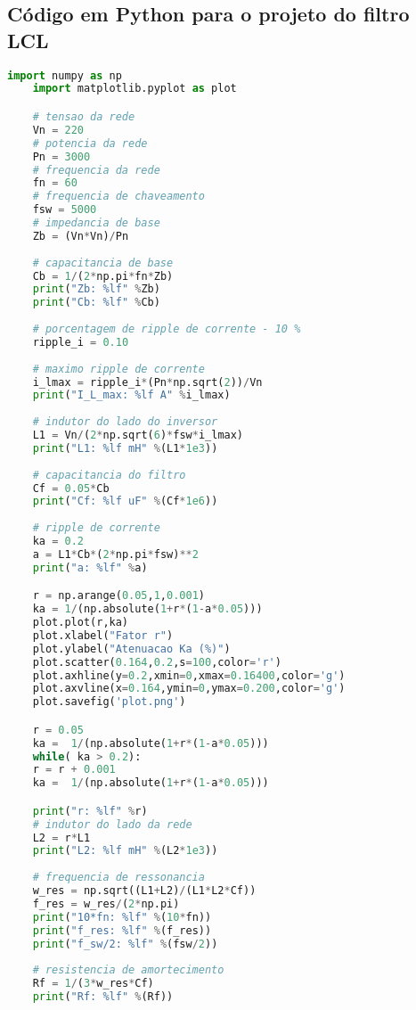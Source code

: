 \begin{anexosenv}

\partanexos

\chapter{Código em Python para o projeto do filtro LCL}\label{codigo-python-filtro}

\begin{lstlisting}[language=Python]
    import numpy as np 
    import matplotlib.pyplot as plot

    # tensao da rede
    Vn = 220
    # potencia da rede
    Pn = 3000
    # frequencia da rede
    fn = 60
    # frequencia de chaveamento
    fsw = 5000
    # impedancia de base
    Zb = (Vn*Vn)/Pn
    
    # capacitancia de base
    Cb = 1/(2*np.pi*fn*Zb)
    print("Zb: %lf" %Zb)
    print("Cb: %lf" %Cb)
    
    # porcentagem de ripple de corrente - 10 %
    ripple_i = 0.10
    
    # maximo ripple de corrente
    i_lmax = ripple_i*(Pn*np.sqrt(2))/Vn
    print("I_L_max: %lf A" %i_lmax)
    
    # indutor do lado do inversor
    L1 = Vn/(2*np.sqrt(6)*fsw*i_lmax)
    print("L1: %lf mH" %(L1*1e3))
    
    # capacitancia do filtro
    Cf = 0.05*Cb
    print("Cf: %lf uF" %(Cf*1e6))
    
    # ripple de corrente
    ka = 0.2
    a = L1*Cb*(2*np.pi*fsw)**2
    print("a: %lf" %a)

    r = np.arange(0.05,1,0.001)
    ka = 1/(np.absolute(1+r*(1-a*0.05)))
    plot.plot(r,ka)
    plot.xlabel("Fator r")
    plot.ylabel("Atenuacao Ka (%)")
    plot.scatter(0.164,0.2,s=100,color='r')
    plot.axhline(y=0.2,xmin=0,xmax=0.16400,color='g')
    plot.axvline(x=0.164,ymin=0,ymax=0.200,color='g')
    plot.savefig('plot.png')

    r = 0.05
    ka =  1/(np.absolute(1+r*(1-a*0.05)))
    while( ka > 0.2):
    r = r + 0.001
    ka =  1/(np.absolute(1+r*(1-a*0.05)))

    print("r: %lf" %r)
    # indutor do lado da rede
    L2 = r*L1
    print("L2: %lf mH" %(L2*1e3))
    
    # frequencia de ressonancia
    w_res = np.sqrt((L1+L2)/(L1*L2*Cf))
    f_res = w_res/(2*np.pi)
    print("10*fn: %lf" %(10*fn))
    print("f_res: %lf" %(f_res))
    print("f_sw/2: %lf" %(fsw/2))
    
    # resistencia de amortecimento
    Rf = 1/(3*w_res*Cf)
    print("Rf: %lf" %(Rf))

\end{lstlisting}

\end{anexosenv}

